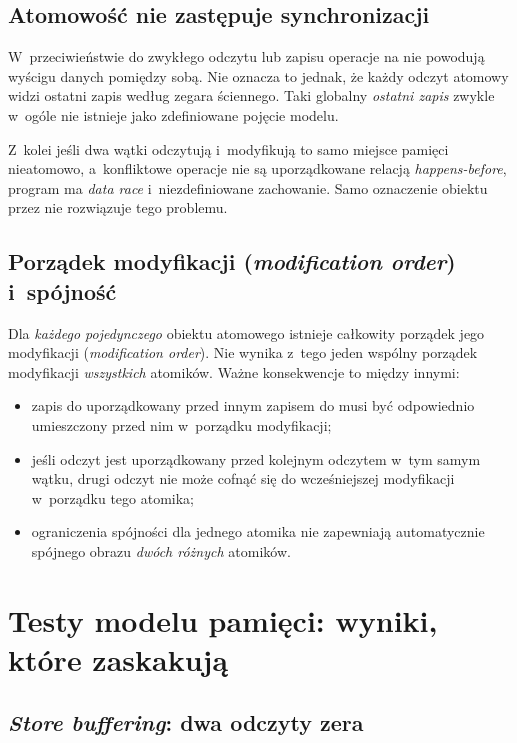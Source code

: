 \subsection{Atomowość nie zastępuje synchronizacji}

W~przeciwieństwie do zwykłego odczytu lub zapisu operacje na
 nie powodują wyścigu danych pomiędzy sobą.
Nie oznacza to jednak, że każdy odczyt atomowy widzi ostatni zapis
według zegara ściennego. Taki globalny \emph{ostatni zapis} zwykle
w~ogóle nie istnieje jako zdefiniowane pojęcie modelu.

Z~kolei jeśli dwa wątki odczytują i~modyfikują to samo miejsce pamięci
nieatomowo, a~konfliktowe operacje nie są uporządkowane relacją
\emph{happens-before}, program ma \emph{data race} i~niezdefiniowane zachowanie.
Samo oznaczenie obiektu przez  nie rozwiązuje tego problemu.

\subsection{Porządek modyfikacji (\emph{modification order}) i~spójność}

Dla \emph{każdego pojedynczego} obiektu atomowego istnieje całkowity
porządek jego modyfikacji (\emph{modification order}). Nie wynika z~tego
jeden wspólny porządek modyfikacji \emph{wszystkich} atomików.
Ważne konsekwencje to między innymi:
\begin{itemize}
\item zapis do  uporządkowany przed innym zapisem do 
      musi być odpowiednio umieszczony przed nim w~porządku modyfikacji;
\item jeśli odczyt  jest uporządkowany przed kolejnym odczytem
       w~tym samym wątku, drugi odczyt nie może cofnąć się
      do wcześniejszej modyfikacji w~porządku tego atomika;
\item ograniczenia spójności dla jednego atomika nie zapewniają
      automatycznie spójnego obrazu \emph{dwóch różnych} atomików.
\end{itemize}

\section{Testy modelu pamięci: wyniki, które zaskakują}
\label{sec:cpp16-litmus}

\subsection{\emph{Store buffering}: dwa odczyty zera}

